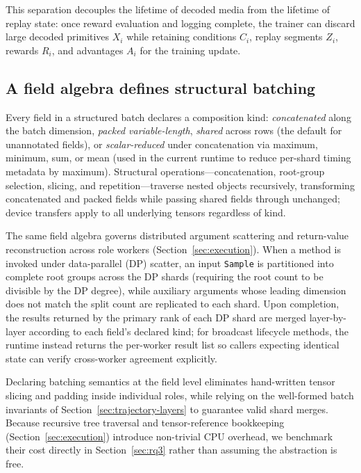 \documentclass[10pt]{article}
\newcommand{\sample}{\texttt{Sample}}
\begin{document}
This separation decouples the lifetime of decoded media from the lifetime of replay state: once reward evaluation and logging complete, the trainer can discard large decoded primitives $X_i$ while retaining conditions $C_i$, replay segments $Z_i$, rewards $R_i$, and advantages $A_i$ for the training update.

\subsection{A field algebra defines structural batching}

Every field in a structured batch declares a composition kind: \emph{concatenated} along the batch dimension, \emph{packed variable-length}, \emph{shared} across rows (the default for unannotated fields), or \emph{scalar-reduced} under concatenation via maximum, minimum, sum, or mean (used in the current runtime to reduce per-shard timing metadata by maximum).
Structural operations---concatenation, root-group selection, slicing, and repetition---traverse nested objects recursively, transforming concatenated and packed fields while passing shared fields through unchanged; device transfers apply to all underlying tensors regardless of kind.

The same field algebra governs distributed argument scattering and return-value reconstruction across role workers (Section~\ref{sec:execution}).
When a method is invoked under data-parallel (DP) scatter, an input \sample{} is partitioned into complete root groups across the DP shards (requiring the root count to be divisible by the DP degree), while auxiliary arguments whose leading dimension does not match the split count are replicated to each shard.
Upon completion, the results returned by the primary rank of each DP shard are merged layer-by-layer according to each field's declared kind; for broadcast lifecycle methods, the runtime instead returns the per-worker result list so callers expecting identical state can verify cross-worker agreement explicitly.

Declaring batching semantics at the field level eliminates hand-written tensor slicing and padding inside individual roles, while relying on the well-formed batch invariants of Section~\ref{sec:trajectory-layers} to guarantee valid shard merges.
Because recursive tree traversal and tensor-reference bookkeeping (Section~\ref{sec:execution}) introduce non-trivial CPU overhead, we benchmark their cost directly in Section~\ref{sec:rq3} rather than assuming the abstraction is free.
\end{document}

